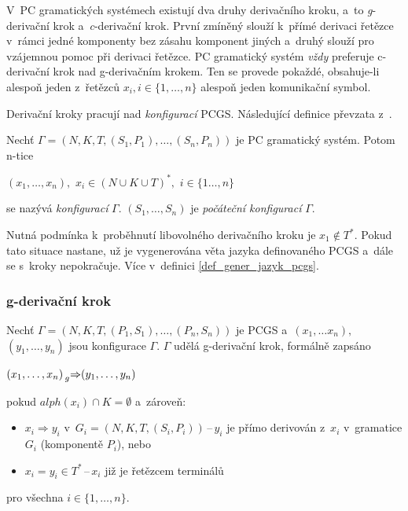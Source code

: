 V~PC gramatických systémech existují dva druhy derivačního kroku, a~to \emph{g}-derivační krok a~\emph{c}-derivační krok.
První zmíněný slouží k~přímé derivaci řetězce v~rámci jedné komponenty bez zásahu komponent jiných a~druhý slouží pro vzájemnou pomoc při derivaci řetězce. 
PC gramatický systém \emph{vždy} preferuje c-derivační krok nad g-derivačním krokem.
Ten se provede pokaždé, obsahuje-li alespoň jeden z~řetězců $x_i, i \in \{1, \ldots, n\}$ alespoň jeden komunikační symbol.

Derivační kroky pracují nad \emph{konfigurací} PCGS.
Následující definice převzata z~\cite{Various-communications-in-PC-grammar-systems}.
\begin{definition}
    Nechť $\Gamma = (N, K, T, (S_1, P_1), \ldots, (S_n, P_n))$ je PC gramatický systém.
    Potom n-tice
    \begin{center}
        $(x_1, \ldots, x_n),$ $x_i \in (N \cup K \cup T)^*,$ $i \in \{1 \ldots, n\}$
    \end{center}
    se nazývá \emph{konfigurací} $\Gamma$. $(S_1, \ldots, S_n)$ je \emph{počáteční konfigurací} $\Gamma$.
\end{definition}
Nutná podmínka k~proběhnutí libovolného derivačního kroku je $x_1 \notin T^*$.
Pokud tato situace nastane, už je vygenerována věta jazyka definovaného PCGS a~dále se s~kroky nepokračuje. 
Více v~definici \ref{def_gener_jazyk_pcgs}.

\subsubsection*{g-derivační krok}\label{kap_g_der_krok}
Nechť $\Gamma = (N, K, T, (P_1, S_1), \ldots, (P_n, S_n))$ je PCGS a~$(x_1, \ldots x_n),$ $(y_1, \ldots, y_n)$ jsou konfigurace $\Gamma$.
$\Gamma$ udělá g-derivační krok, formálně zapsáno
\begin{center}
    $(x_1, \ldots, x_n) \prescript{}{g}{\Rightarrow} (y_1, \ldots, y_n)$
\end{center}
pokud $alph(x_i) \cap K = \emptyset$ a~zároveň:
\begin{itemize}
    \item $x_i \Rightarrow y_i$ v~$G_i = (N, K, T, (S_i, P_i))$\,--\,$y_i$ je přímo derivován z~$x_i$ v~gramatice $G_i$ (komponentě $P_i$), nebo
    \item $x_i = y_i \in T^*$\,--\,$x_i$ již je řetězcem terminálů
\end{itemize}   
pro všechna $i \in \{1, \ldots, n\}$.

